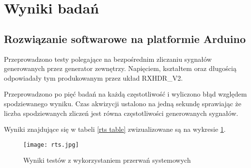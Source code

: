 \section{Wyniki badań}

\subsection{Rozwiązanie softwarowe na platformie Arduino}

Przeprowadzono testy polegające na bezpośrednim zliczaniu sygnałów generowanych przez generator zewnętrzy. 
Napięciem, kształtem oraz długością odpowiadały tym produkowanym przez układ RXHDR\_V2.

Przeprowadzono po pięć badań na każdą częstotliwość i wyliczono błąd względem spodziewanego wyniku. 
Czas akwizycji ustalono na jedną sekundę sprawiając że liczba spodziewanych zliczeń jest równa częstotliwości generowanych sygnałów.

Wyniki znajdujące się w tabeli \ref{rts table} zwizualizowane są na wykresie \ref{rts wyniki}.


\begin{figure}[]
        \centering
        \texttt{[image: rts.jpg]}
        \caption{Wyniki testów z wykorzystaniem przerwań systemowych}
        \label{rts wyniki}
\end{figure}

